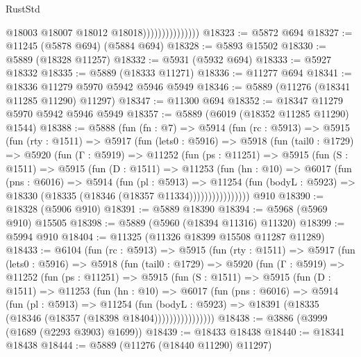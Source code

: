 \begin{lexlean}{RustStd}
\begin{coremodule}
                                  @18003
                                  @18007
                                  @18012
                                  @18018)))))))))))))))
@18323 := @5872 @694
@18327 := @11245 (@5878 @694) (@5884 @694)
@18328 := @5893 @15502
@18330 := @5889 (@18328 @11257)
@18332 := @5931 (@5932 @694)
@18333 := @5927 @18332
@18335 := @5889 (@18333 @11271)
@18336 := @11277 @694
@18341 := @18336 @11279 @5970 @5942 @5946 @5949
@18346 := @5889 (@11276 (@18341 @11285 @11290) @11297)
@18347 := @11300 @694
@18352 := @18347 @11279 @5970 @5942 @5946 @5949
@18357 := @5889 (@6019 (@18352 @11285 @11290) @1544)
@18388 := @5888
    (fun (fn : @7) =>
    @5914
      (fun (rc : @5913) =>
      @5915
        (fun (rty : @1511) =>
        @5917
          (fun (lets0 : @5916) =>
          @5918
            (fun (tail0 : @1729) =>
            @5920
              (fun (Γ : @5919) =>
              @11252
                (fun (ps : @11251) =>
                @5915
                  (fun (S : @1511) =>
                  @5915
                    (fun (D : @1511) =>
                    @11253
                      (fun (hn : @10) =>
                      @6017
                        (fun (pns : @6016) =>
                        @5914
                          (fun (pl : @5913) =>
                          @11254
                            (fun (bodyL : @5923) =>
                            @18330 (@18335 (@18346 (@18357 @11334))))))))))))))))
    @910
@18390 := @18328 (@5906 @910)
@18391 := @5889 @18390
@18394 := @5968 (@5969 @910) @15505
@18398 := @5889 (@5960 (@18394 @11316) @11320)
@18399 := @5994 @910
@18404 := @11325 (@11326 @18399 @15508 @11287 @11289)
@18433 := @6104
    (fun (rc : @5913) =>
    @5915
      (fun (rty : @1511) =>
      @5917
        (fun (lets0 : @5916) =>
        @5918
          (fun (tail0 : @1729) =>
          @5920
            (fun (Γ : @5919) =>
            @11252
              (fun (ps : @11251) =>
              @5915
                (fun (S : @1511) =>
                @5915
                  (fun (D : @1511) =>
                  @11253
                    (fun (hn : @10) =>
                    @6017
                      (fun (pns : @6016) =>
                      @5914
                        (fun (pl : @5913) =>
                        @11254
                          (fun (bodyL : @5923) =>
                          @18391 (@18335 (@18346 (@18357 (@18398 @18404))))))))))))))))
@18438 := @3886 (@3999 (@1689 (@2293 @3903) @1699))
@18439 := @18433 @18438
@18440 := @18341 @18438
@18444 := @5889 (@11276 (@18440 @11290) @11297)

\end{coremodule}
\end{lexlean}
